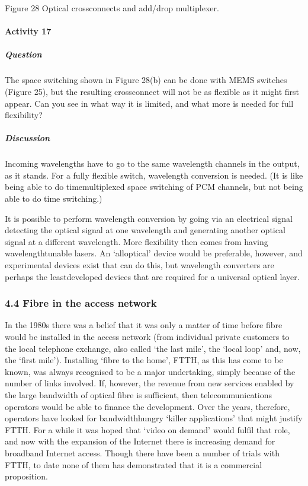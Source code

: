 \documentclass[letterpaper,10pt,english]{sphinxmanual}
\let\sphinxpxdimen\pdfpxdimen\else\newdimen\sphinxpxdimen
\begin{document}
\sphinxincludegraphics[width=511\sphinxpxdimen,height=872\sphinxpxdimen]{{companionhighres_001i}.jpg}

Figure 28 Optical cross\sphinxhyphen{}connects and add/drop multiplexer.


\paragraph{Activity 17}
\label{\detokenize{content/session_00/Part_00_04:Activity-17}}

\subparagraph{Question}
\label{\detokenize{content/session_00/Part_00_04:id8}}
The space switching shown in Figure 28(b) can be done with MEMS switches (Figure 25), but the resulting cross\sphinxhyphen{}connect will not be as flexible as it might first appear. Can you see in what way it is limited, and what more is needed for full flexibility?


\subparagraph{Discussion}
\label{\detokenize{content/session_00/Part_00_04:id9}}
Incoming wavelengths have to go to the same wavelength channels in the output, as it stands. For a fully flexible switch, wavelength conversion is needed. (It is like being able to do time\sphinxhyphen{}multiplexed space switching of PCM channels, but not being able to do time switching.)

It is possible to perform wavelength conversion by going via an electrical signal \textendash{} detecting the optical signal at one wavelength and generating another optical signal at a different wavelength. More flexibility then comes from having wavelength\sphinxhyphen{}tunable lasers. An ‘all\sphinxhyphen{}optical’ device would be preferable, however, and experimental devices exist that can do this, but wavelength converters are perhaps the least\sphinxhyphen{}developed devices that are required for a universal optical layer.


\subsubsection{4.4 Fibre in the access network}
\label{\detokenize{content/session_00/Part_00_04:4.4-Fibre-in-the-access-network}}
In the 1980s there was a belief that it was only a matter of time before fibre would be installed in the access network (from individual private customers to the local telephone exchange, also called ‘the last mile’, the ‘local loop’ and, now, the ‘first mile’). Installing ‘fibre to the home’, FTTH, as this has come to be known, was always recognised to be a major undertaking, simply because of the number of links involved. If, however, the revenue from new services enabled by the large
bandwidth of optical fibre is sufficient, then telecommunications operators would be able to finance the development. Over the years, therefore, operators have looked for bandwidth\sphinxhyphen{}hungry ‘killer applications’ that might justify FTTH. For a while it was hoped that ‘video on demand’ would fulfil that role, and now with the expansion of the Internet there is increasing demand for broadband Internet access. Though there have been a number of trials with FTTH, to date none of them has demonstrated
that it is a commercial proposition.
\end{document}
